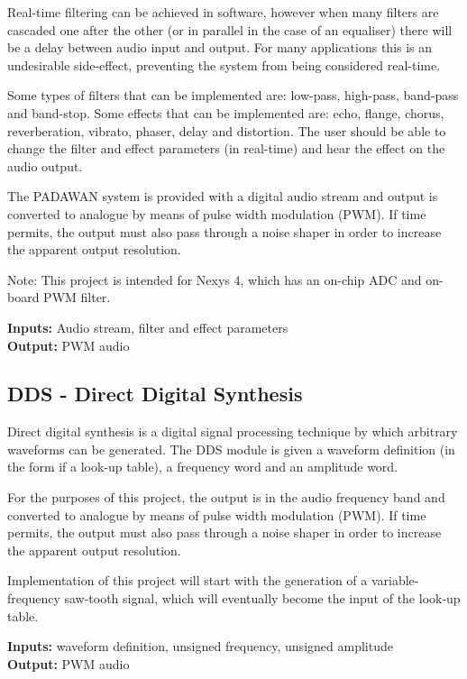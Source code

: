 Real-time filtering can be achieved in software, however when many filters are cascaded one after the other (or in parallel in the case of an equaliser) there will be a delay between audio input and output. For many applications this is an undesirable side-effect, preventing the system from being considered real-time.

Some types of filters that can be implemented are: low-pass, high-pass, band-pass and band-stop. Some effects that can be implemented are: echo, flange, chorus, reverberation, vibrato, phaser, delay and distortion. The user should be able to change the filter and effect parameters (in real-time) and hear the effect on the audio output.

The PADAWAN system is provided with a digital audio stream and output is converted to analogue by means of pulse width modulation (PWM). If time permits, the output must also pass through a noise shaper in order to increase the apparent output resolution.

Note: This project is intended for Nexys 4, which has an on-chip ADC and on-board PWM filter.

\textbf{Inputs:} Audio stream, filter and effect parameters\\
\textbf{Output:} PWM audio

\subsection{DDS - Direct Digital Synthesis}
Direct digital synthesis is a digital signal processing technique by which arbitrary waveforms can be generated. The DDS module is given a waveform definition (in the form if a look-up table), a frequency word and an amplitude word.

For the purposes of this project, the output is in the audio frequency band and converted to analogue by means of pulse width modulation (PWM). If time permits, the output must also pass through a noise shaper in order to increase the apparent output resolution.

Implementation of this project will start with the generation of a variable-frequency saw-tooth signal, which will eventually become the input of the look-up table.

\textbf{Inputs:} waveform definition, unsigned frequency, unsigned amplitude\\
\textbf{Output:} PWM audio
